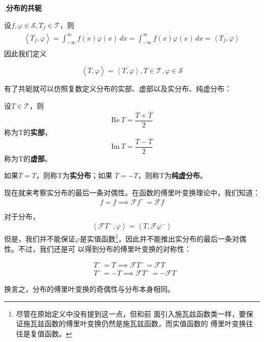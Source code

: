 \documentclass{ctexbook}
\begin{document}
.\textbf{分布的共轭}

设$f,\varphi\in\mathcal{S} ,T_f\in\mathcal{T} $，则
\begin{align*}
    \left\langle \overline{T_f},\varphi\right\rangle=\int_{-\infty}^{\infty}\overline{f(x)}\varphi(x)\,dx=\overline{\int_{-\infty}^{\infty}f(x)\overline{\varphi(x)}\,dx}=\overline{\left\langle T_f,\overline{\varphi}\right\rangle} \\
\end{align*}
因此我们定义\begin{definition}[分布的共轭]
    \begin{equation*}
    \left\langle \overline{T},\varphi\right\rangle=\overline{\left\langle T,\overline{\varphi}\right\rangle},T\in\mathcal{T} ,\varphi\in\mathcal{S}
\end{equation*}
\end{definition}

有了共轭就可以仿照复数定义分布的实部、虚部以及实分布、纯虚分布：
\begin{definition}[分布的实部、虚部]
    设$T\in\mathcal{T} $，则
    \[\text{Re}\ T=\frac{T+\overline{T}}{2}\]
    称为T的\textbf{实部}，
    \[\text{Im}\ T=\frac{T-\overline{T}}{2}\]
    称为T的\textbf{虚部}。
\end{definition}
\begin{definition}[实分布与纯虚分布]
如果$\overline{T}=T$，则称T为\textbf{实分布}；如果
$\overline{T}=-T$，则称T为\textbf{纯虚分布}。
\end{definition}
现在就来考察实分布的最后一条对偶性。在函数的傅里叶变换理论中，我们知道：
    \[f=\overline{f}\implies \mathcal{F}f^- =\overline{\mathcal{F} f}\]

对于分布，
\begin{align*}
    \left\langle\mathcal{F}T^-,\varphi\right\rangle =\left\langle T,\mathcal{F}\varphi^-\right\rangle
\end{align*}
但是，我们并不能保证$\varphi$是实值函数\footnote{尽管在原始定义中没有提到这一点，但和前
    面引入施瓦兹函数类一样，要保证施瓦兹函数的傅里叶变换仍然是施瓦兹函数，而实值函数的
    傅里叶变换往往是复值函数。}，因此并不能推出实分布的最后一条对偶性。不过，我们还是可
以得到分布的傅里叶变换的对称性：
\begin{theorem}[分布的傅里叶变换的对称性]
    \begin{align*}
    &T^-=T\implies\mathcal{F} T^-=\mathcal{F} T \\
    &T^-=-T\implies\mathcal{F} T^-=-\mathcal{F} T
\end{align*}
\end{theorem}
换言之，分布的傅里叶变换的奇偶性与分布本身相同。
\end{document}
